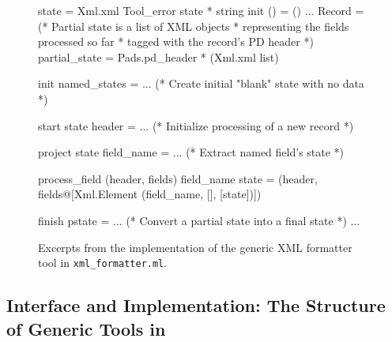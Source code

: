\begin{figure}
\begin{code}\scriptsize
{} state = Xml.xml
 Tool_error  state * string
 init () = ()
...
 Record = 
  (* Partial state is a list of XML objects 
   * representing the fields processed so far 
   * tagged with the record's PD header *)
   partial_state = Pads.pd_header * (Xml.xml list)

   init named_states =
    ... (* Create initial "blank" state with no data *)

   start state header =
    ... (* Initialize processing of a new record *)

   project state field_name =
    ... (* Extract named field's state *)

   process_field (header, fields) field_name state =
    (header, fields@[Xml.Element 
    	(field_name, [], [state])])

   finish pstate =
    ... (* Convert a partial state into a final state *)
...
\end{code}
\caption{Excerpts from the implementation of the generic XML formatter tool in {\tt xml\_formatter.ml}.}
\label{fig:gentool-xmlf-code}
\end{figure}

\subsection{Interface and Implementation: The Structure of Generic Tools in \padsml{}}
\label{sec:gentool-impl}

